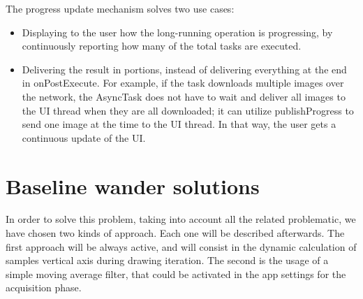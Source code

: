 The progress update mechanism solves two use cases:
\begin{itemize}
	\item Displaying to the user how the long-running operation is progressing, by continuously reporting how many of the total tasks are executed.
	\item Delivering the result in portions, instead of delivering everything at the end in onPostExecute. For example, if the task downloads multiple images over the network, the AsyncTask does not have to wait and deliver all images to the UI thread when they are all downloaded; it can utilize publishProgress to send one image at the time to the UI thread. In that way, the user gets a continuous update of the UI.\cite{ref19}
\end{itemize}

\section{Baseline wander solutions}
In order to solve this problem, taking into account all the related problematic, we have chosen two kinds of approach. Each one will be described afterwards. The first approach will be always active, and will consist in the dynamic calculation of samples vertical axis during drawing iteration. The second is the usage of a simple moving average filter, that could be activated in the app settings for the acquisition phase.

